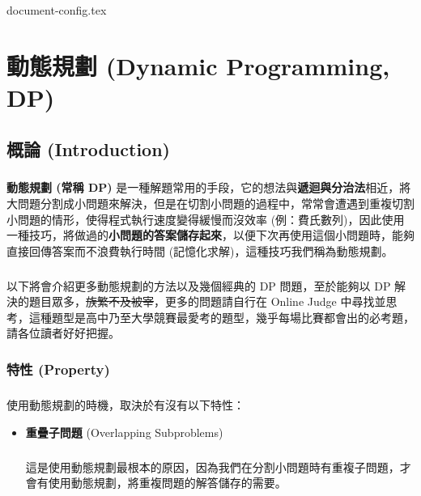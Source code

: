 \documentclass[12pt,a4paper,oneside]{report}
\begin{document}
\begin{CJK}{UTF8}{bkai}

{document-config.tex}
\setcounter{chapter}{5}

\fi

\chapter{動態規劃 (Dynamic Programming, DP)}

\section{概論 (Introduction)}

\paragraph{}\textbf{動態規劃 (常稱 DP)} 是一種解題常用的手段，它的想法與\textbf{遞迴與分治法}相近，將大問題分割成小問題來解決，但是在切割小問題的過程中，常常會遭遇到重複切割小問題的情形，使得程式執行速度變得緩慢而沒效率 (例：費氏數列)，因此使用一種技巧，將做過的\textbf{小問題的答案儲存起來}，以便下次再使用這個小問題時，能夠直接回傳答案而不浪費執行時間 (記憶化求解)，這種技巧我們稱為動態規劃。
\paragraph{}以下將會介紹更多動態規劃的方法以及幾個經典的 DP 問題，至於能夠以 DP 解決的題目眾多，\sout{族繁不及被宰}，更多的問題請自行在 Online Judge 中尋找並思考，這種題型是高中乃至大學競賽最愛考的題型，幾乎每場比賽都會出的必考題，請各位讀者好好把握。

\subsection{特性 (Property)}

\paragraph{}使用動態規劃的時機，取決於有沒有以下特性：
\begin{itemize}
\item \textbf{重疊子問題} (Overlapping Subproblems)
\paragraph{}這是使用動態規劃最根本的原因，因為我們在分割小問題時有重複子問題，才會有使用動態規劃，將重複問題的解答儲存的需要。


\end{itemize}
\end{CJK}
\end{document}

